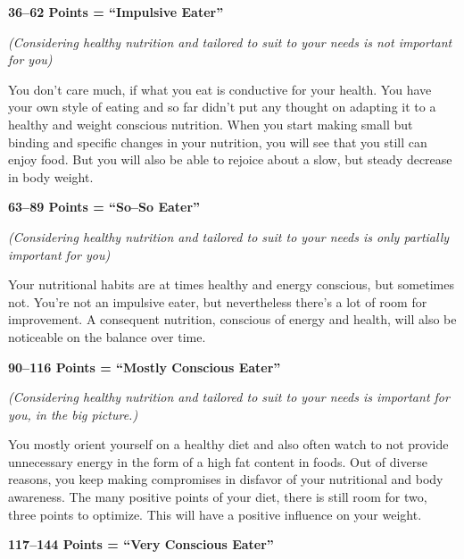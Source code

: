 \documentclass[../main.tex]{subfiles}
\begin{document}
\noindent \textbf{36--62 Points = ``Impulsive Eater''}

\noindent  \emph{(Considering healthy nutrition and tailored to suit to your needs is not important for you)}

\vspace{2mm}

  You don't care much, if what you eat is conductive for your health.
  You have your  own style of eating and so far didn't put any thought on adapting it to a healthy and weight conscious nutrition.
  When you start making small but binding and specific changes in your nutrition, you will see that you still can enjoy food.
  But you will also be able to rejoice about a slow, but steady decrease in body weight.

\vspace{5mm}

\noindent \textbf{63--89 Points = ``So--So Eater''}

\noindent  \emph{(Considering healthy nutrition and tailored to suit to your needs is only partially important for you)}

\vspace{2mm}

Your nutritional habits are at times healthy and energy conscious, but sometimes not.
You're not an impulsive eater, but nevertheless there's a lot of room for improvement.
A consequent nutrition, conscious of energy and health, will also be noticeable on the balance over time.

\vspace{5mm}

\noindent \textbf{90--116 Points = ``Mostly Conscious Eater''}

\noindent  \emph{(Considering healthy nutrition and tailored to suit to your needs is important for you, in the big picture.)}

\vspace{2mm}

You mostly orient yourself on a healthy diet and also often watch to not provide unnecessary energy in the form of a high fat content in foods.
Out of diverse reasons, you keep making compromises in disfavor of your nutritional and body awareness.
The many positive points of your diet, there is still room for two, three points to optimize.
This will have a positive influence on your weight.

\vspace{5mm}

\noindent \textbf{117--144 Points = ``Very Conscious Eater''}
\end{document}

